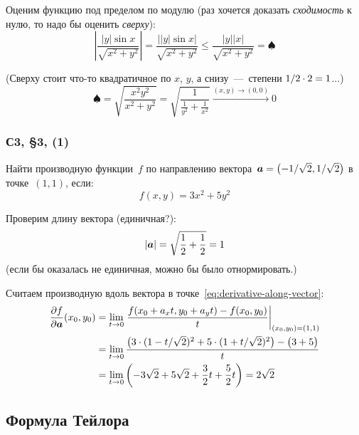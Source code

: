 \documentclass[a4paper,12pt]{article}
\begin{document}
\begin{solution}
    Оценим функцию под пределом по модулю (раз хочется доказать \emph{сходимость} к нулю, то надо бы оценить \emph{сверху}):
    \[
      \left|\frac{|y| \sin x}{\sqrt{x^2 + y^2}}\right| = \frac{\bigl||y| \sin x\bigr|}{\sqrt{x^2 + y^2}}
      \leq \frac{|y| |x|}{\sqrt{x^2 + y^2}} = \spadesuit
    \]

    (Сверху стоит что-то квадратичное по $x$, $y$, а снизу~---~степени $1 \hm/ 2 \hm\cdot 2 \hm= 1$...)
    \[
      \spadesuit = \sqrt{\frac{x^2 y^2}{x^2 + y^2}}
        = \sqrt{\frac{1}{\frac{1}{y^2} + \frac{1}{x^2}}} \xrightarrow{(x, y) \to (0, 0)} 0
    \]
  \end{solution}


  \subsubsection{С3, \S 3, (1)}

  Найти производную функции~$f$ по направлению вектора~$\bds a \hm= \bigl(-1 \hm/ \sqrt{2}, 1 \hm/ \sqrt{2}\bigr)$ в точке~$(1, 1)$, если:
  \[
    f(x, y) = 3x^2 + 5y^2
  \]
  
  \begin{solution}
    Проверим длину вектора (единичная?):
    \[
      |\boldsymbol a| = \sqrt{\frac{1}{2} + \frac{1}{2}} = 1
    \]
    (если бы оказалась не единичная, можно бы было отнормировать.)

    Считаем производную вдоль вектора в точке~\eqref{eq:derivative-along-vector}:
    \begin{equation*}
    \begin{split}
      \frac{\partial f}{\partial \boldsymbol a}(x_0, y_0) &= \lim_{t \to 0} \left.\frac{f(x_0 + a_x t, y_0 + a_y t) - f(x_0, y_0)}{t}\right|_{(x_0, y_0) = (1, 1)}\\
      &= \lim_{t \to 0} \frac{\bigl(3 \cdot (1 - t/\sqrt{2})^2 + 5 \cdot(1 + t / \sqrt{2})^2\bigr) - \bigl(3 + 5\bigr)}{t}\\
      &= \lim_{t \to 0} \left(-3 \sqrt{2} + 5 \sqrt{2} + \frac{3}{2} t + \frac{5}{2} t\right) = 2 \sqrt{2}
    \end{split}
    \end{equation*}
  \end{solution}


  \subsection{Формула Тейлора}
\end{document}
